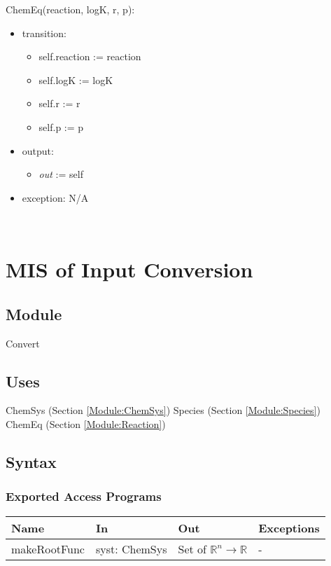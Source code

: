 \documentclass[12pt, titlepage]{article}
\begin{document}
\noindent ChemEq(reaction, logK, r, p):
\begin{itemize}
\item transition: \begin{itemize} 
                  \item[] self.reaction := reaction
                  \item[] self.logK := logK
                  \item[] self.r := r
                  \item[] self.p := p
                  \end{itemize}
\item output: \begin{itemize} 
              \item[] \emph{out} := self 
              \end{itemize}
\item exception: N/A
\end{itemize}

~\newpage


\section{MIS of Input Conversion} \label{Module:Convert} 

\subsection{Module}

Convert

\subsection{Uses}

ChemSys (Section \ref{Module:ChemSys})
\newline Species (Section \ref{Module:Species})
\newline ChemEq (Section \ref{Module:Reaction})

\subsection{Syntax}

\subsubsection{Exported Access Programs}

\begin{center}
\begin{tabular}{p{3cm} p{3cm} p{3.2cm} p{2.8cm}}
\hline
\textbf{Name} & \textbf{In} & \textbf{Out} & \textbf{Exceptions} \\
\hline
makeRootFunc & syst: ChemSys & Set of \newline $\mathbb{R}^{n} \rightarrow \mathbb{R}$ & - \\
\hline
\end{tabular}
\end{center}
\end{document}
